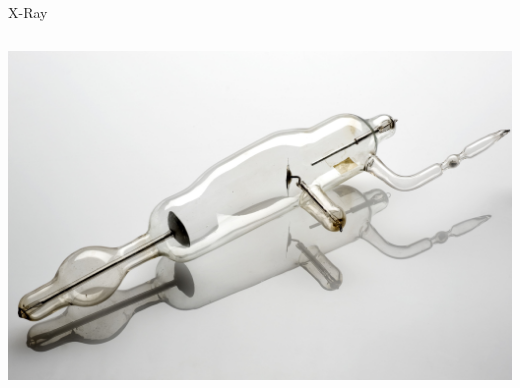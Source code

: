 \begin{frame}[c]{X-Ray}
\begin{columns}[c, onlytextwidth]
\begin{column}{0.45\textwidth}
		\includegraphics[height=0.4\textheight]{images/x-ray_tube.jpg}
	\end{column}
\end{columns}


\end{frame}


%
%

